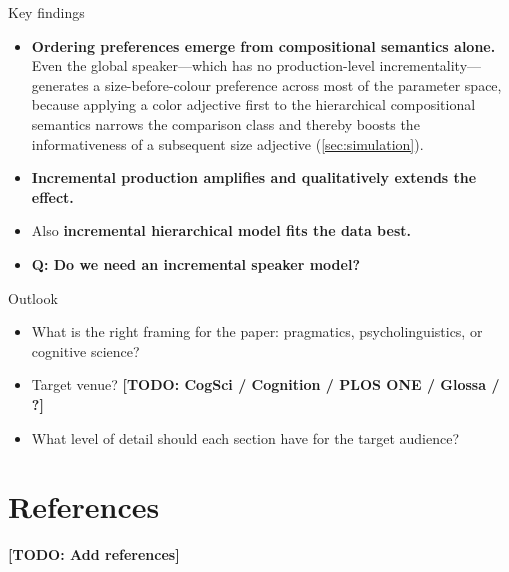 \documentclass[11pt, a4paper]{article}
\newcommand{\todo}[1]{\textcolor{BrickRed}{\textbf{[TODO: #1]}}}
\begin{document}
\begin{discussbox}{Key findings}
  \begin{itemize}[leftmargin=*]
  \item \textbf{Ordering preferences emerge from compositional semantics alone.}
    Even the global speaker---which has no production-level incrementality---generates a size-before-colour preference across most of the parameter space, because applying a color adjective first to the hierarchical compositional semantics narrows the comparison class and thereby boosts the informativeness of a subsequent size adjective (\cref{sec:simulation}).
  \item \textbf{Incremental production amplifies and qualitatively extends the effect.}
  \item Also \textbf{incremental hierarchical model fits the data best.}
  \item \textbf{Q: Do we need an incremental speaker model?}
\end{itemize}
\end{discussbox}


\begin{discussbox}{Outlook}
\begin{itemize}[leftmargin=*]
  \item What is the right framing for the paper: pragmatics, psycholinguistics,
    or cognitive science?
  \item Target venue?  \todo{CogSci / Cognition / PLOS ONE / Glossa / ?}
  \item What level of detail should each section have for the target audience?
\end{itemize}
\end{discussbox}


\section*{References}

\todo{Add references}


\end{document}
